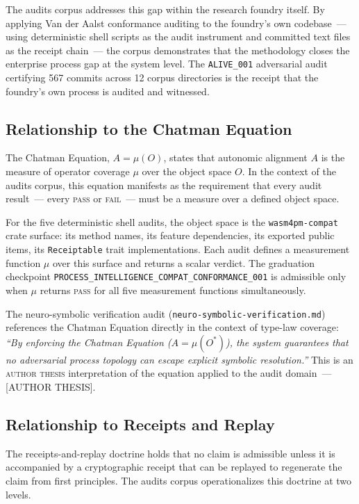 The audits corpus addresses this gap within the research foundry itself. By
applying Van der Aalst conformance auditing to the foundry's own codebase~---
using deterministic shell scripts as the audit instrument and committed text
files as the receipt chain~--- the corpus demonstrates that the methodology
closes the enterprise process gap at the system level. The \texttt{ALIVE\_001}
adversarial audit certifying 567 commits across 12 corpus directories is the
receipt that the foundry's own process is audited and witnessed.

\subsection{Relationship to the Chatman Equation}
\label{sec:audits-lineage-chatman-equation}

The Chatman Equation, \(A = \mu(O)\), states that autonomic alignment \(A\) is
the measure of operator coverage \(\mu\) over the object space \(O\). In the
context of the audits corpus, this equation manifests as the requirement that
every audit result~--- every \textsc{pass} or \textsc{fail}~--- must be a
measure over a defined object space.

For the five deterministic shell audits, the object space is the
\texttt{wasm4pm-compat} crate surface: its method names, its feature
dependencies, its exported public items, its \texttt{Receiptable} trait
implementations. Each audit defines a measurement function \(\mu\) over this
surface and returns a scalar verdict. The graduation checkpoint
\texttt{PROCESS\_INTELLIGENCE\_COMPAT\_CONFORMANCE\_001} is admissible only when
\(\mu\) returns \textsc{pass} for all five measurement functions simultaneously.

The neuro-symbolic verification audit (\texttt{neuro-symbolic-verification.md})
references the Chatman Equation directly in the context of type-law coverage:
\emph{``By enforcing the Chatman Equation (\(A = \mu(O^*)\)), the system
guarantees that no adversarial process topology can escape explicit symbolic
resolution.''} This is an \textsc{author thesis} interpretation of the equation
applied to the audit domain~--- [AUTHOR THESIS].

\subsection{Relationship to Receipts and Replay}
\label{sec:audits-lineage-receipts}

The receipts-and-replay doctrine holds that no claim is admissible unless it is
accompanied by a cryptographic receipt that can be replayed to regenerate the
claim from first principles. The audits corpus operationalizes this doctrine at
two levels.

